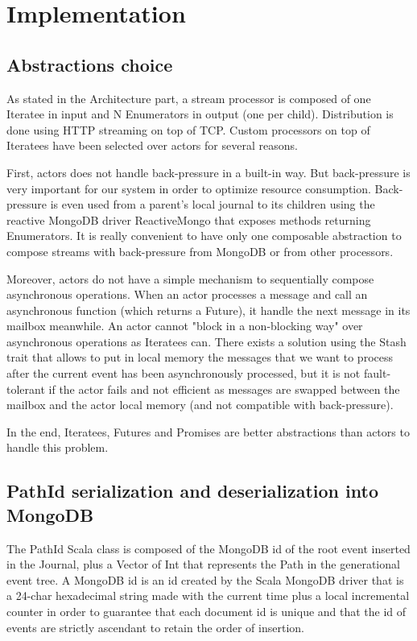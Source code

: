 \section{Implementation}
\label{sec:streamimplementation}

\subsection{Abstractions choice}

As stated in the Architecture part, a stream processor is composed of one Iteratee in input and N Enumerators in output (one per child). Distribution is done using HTTP streaming on top of TCP. Custom processors on top of Iteratees have been selected over actors for several reasons.

First, actors does not handle back-pressure in a built-in way. But back-pressure is very important for our system in order to optimize resource consumption. Back-pressure is even
used from a parent's local journal to its children using the reactive MongoDB driver ReactiveMongo  that exposes methods returning Enumerators. It is really convenient to have only one composable abstraction to compose streams with back-pressure from MongoDB or from other processors.

Moreover, actors do not have a simple mechanism to sequentially compose asynchronous operations. When an actor processes a message and call an asynchronous function (which
returns a Future), it handle the next message in its mailbox meanwhile. An actor cannot "block in a non-blocking way" over asynchronous operations as Iteratees can. There exists
a solution using the Stash trait  that allows to put in local memory the messages that we want to process after the current event has been asynchronously processed, but it is not fault-tolerant if the actor fails and not efficient as messages are swapped between the mailbox and the actor local memory (and not compatible with back-pressure).

In the end, Iteratees, Futures and Promises are better abstractions than actors to handle this problem.

\subsection{PathId serialization and deserialization into MongoDB}

The PathId Scala class is composed of the MongoDB id of the root event inserted in the Journal, plus a Vector of Int that represents the Path in the generational event tree.
A MongoDB id is an id created by the Scala MongoDB driver that is a 24-char hexadecimal string made with the current time plus a local incremental counter in order to guarantee that
each document id is unique and that the id of events are strictly ascendant to retain the order of insertion.

